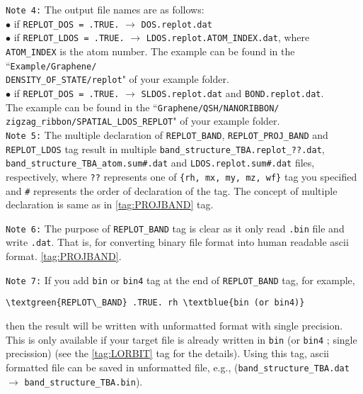 \documentclass[a4paper,12pt]{scrartcl}
\newcommand{\textblue}[1]{\textcolor{blue!85!white}{\texttt{#1}}}
\newcommand{\textgreen}[1]{\textcolor{green!50!black}{\texttt{#1}}}
\begin{document}
\begin{description}
 \texttt{Note 4:} The output file names are as follows: \\
 $\bullet$ if \texttt{REPLOT\_DOS = .TRUE.} $\rightarrow$ \texttt{DOS.replot.dat} \\
 $\bullet$ if \texttt{REPLOT\_LDOS = .TRUE.} $\rightarrow$ 
 \texttt{LDOS.replot.ATOM\_INDEX.dat}, where \texttt{ATOM\_INDEX} is the atom number. The example can be found in the ``\texttt{Example/Graphene/\\DENSITY\_OF\_STATE/replot}" of your example folder. \\
 $\bullet$ if \texttt{REPLOT\_DOS = .TRUE.} $\rightarrow$ \texttt{SLDOS.replot.dat} and 
 \texttt{BOND.replot.dat}.\\
The example can be found in the ``\texttt{Graphene/QSH/NANORIBBON/\\
zigzag\_ribbon/SPATIAL\_LDOS\_REPLOT}" of your example folder.\\

 \texttt{Note 5:} The multiple declaration of \texttt{REPLOT\_BAND}, \texttt{REPLOT\_PROJ\_BAND} and \texttt{REPLOT\_LDOS} tag result in multiple \texttt{band\_structure\_TBA.replot\_\textblue{??}.dat}, \\ \texttt{band\_structure\_TBA\_atom.sum\textblue{\#}.dat} and \texttt{LDOS.replot.sum\textblue{\#}.dat} files, respectively, where \textblue{??} represents one of \textblue{\{rh, mx, my, mz, wf\}} tag you specified and \textblue{\#} represents the order of declaration of the tag. The concept of multiple declaration is same as in
     \ref{tag:PROJBAND} tag.
     
 \texttt{Note 6:} The purpose of \texttt{REPLOT\_BAND} tag is clear
 as it only read \textblue{.bin} file and write \textblue{.dat}. That is, for converting binary file format into human readable ascii format.
     \ref{tag:PROJBAND}.

 \texttt{Note 7:} If you add \textblue{bin} or \textblue{bin4} tag at the end of \texttt{REPLOT\_BAND} tag, for example,

 \begin{Verbatim}[commandchars=\\\{\},gobble=4, framesep=2mm]
    \textgreen{REPLOT\_BAND} .TRUE. rh \textblue{bin (or bin4)}
 \end{Verbatim}
   then the result will be written with unformatted format with single precision. This is only available if your target file is already written in \textblue{bin} (or \textblue{bin4} ; single precission) (see the \ref{tag:LORBIT} tag for the details). Using this tag, ascii formatted file can be saved in unformatted file, e.g., (\texttt{band\_structure\_TBA.dat} $\rightarrow$ \texttt{band\_structure\_TBA.bin}).

\end{description}
\end{document}
